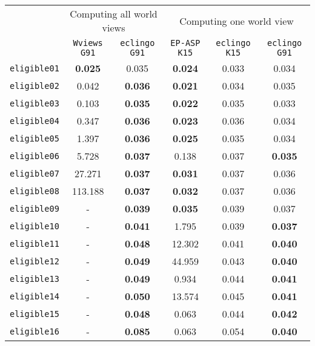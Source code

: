 \documentclass{new_tlp}
\begin{document}
\begin{table}[ht]
\begin{tabular}{c|cc|ccc}
\cline{1-6}
  & \multicolumn{2}{c|}{Computing all world views} & \multicolumn{3}{c}{Computing one world view} \\ \cline{1-6}
  & \texttt{Wviews G91} & \texttt{eclingo G91} & \texttt{EP-ASP K15} & \texttt{eclingo K15} & \texttt{eclingo G91} \\ \cline{1-6}
\texttt{eligible01} & \textbf{0.025}     & 0.035   & \textbf{0.024}    & 0.033    & 0.034    \\
\texttt{eligible02} & 0.042   & \textbf{0.036}   & \textbf{0.021}    & 0.034    & 0.035           \\
\texttt{eligible03} & 0.103   & \textbf{0.035}   & \textbf{0.022}    & 0.035    & 0.033           \\
\texttt{eligible04} & 0.347   & \textbf{0.036}   & \textbf{0.023}    & 0.036    & 0.034           \\
\texttt{eligible05} & 1.397   & \textbf{0.036}   & \textbf{0.025}    & 0.035    & 0.034           \\
\texttt{eligible06} & 5.728   & \textbf{0.037}   & 0.138             & 0.037    & \textbf{0.035}  \\
\texttt{eligible07} & 27.271  & \textbf{0.037}   & \textbf{0.031}    & 0.037    & 0.036           \\
\texttt{eligible08} & 113.188 & \textbf{0.037}   & \textbf{0.032}    & 0.037    & 0.036           \\
\texttt{eligible09} & -       & \textbf{0.039}   & \textbf{0.035}    & 0.039    & 0.037           \\
\texttt{eligible10} & -       & \textbf{0.041}   & 1.795             & 0.039    & \textbf{0.037}  \\
\texttt{eligible11} & -       & \textbf{0.048}   & 12.302            & 0.041    & \textbf{0.040}  \\
\texttt{eligible12} & -       & \textbf{0.049}   & 44.959            & 0.043    & \textbf{0.040}  \\
\texttt{eligible13} & -       & \textbf{0.049}   & 0.934             & 0.044    & \textbf{0.041}  \\
\texttt{eligible14} & -       & \textbf{0.050}   & 13.574            & 0.045    & \textbf{0.041}  \\
\texttt{eligible15} & -       & \textbf{0.048}   & 0.063             & 0.044    & \textbf{0.042}  \\
\texttt{eligible16} & -       & \textbf{0.085}   & 0.063             & 0.054    & \textbf{0.040}  \\

\end{tabular}
\end{table}
\end{document}
